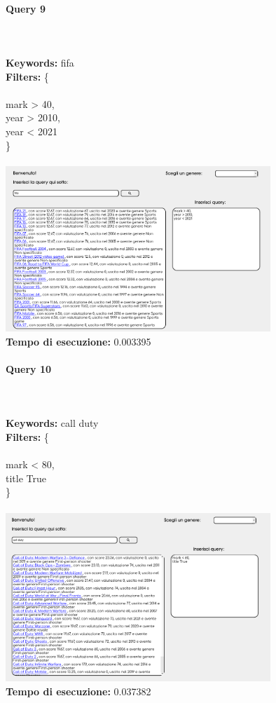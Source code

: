 \documentclass[12pt]{article}
\begin{document}
\paragraph{Query 9} ~ \\ \\

\noindent \textbf{Keywords: } fifa \\
\textbf{Filters: } \{ \\ \\
\indent mark > 40, \\
\indent year > 2010, \\
\indent year < 2021 \\
\} \\\\

\noindent \includegraphics[width=100mm]{Immagini/Image9.png} \\
\textbf{Tempo di esecuzione:} 0.003395 \\
\pagebreak

\paragraph{Query 10} ~ \\ \\

\noindent \textbf{Keywords: } call duty \\
\textbf{Filters: } \{ \\ \\
\indent mark < 80, \\
\indent title True \\
\} \\\\

\noindent \includegraphics[width=100mm]{Immagini/Image10.png} \\
\textbf{Tempo di esecuzione:} 0.037382 \\
\pagebreak
\end{document}
